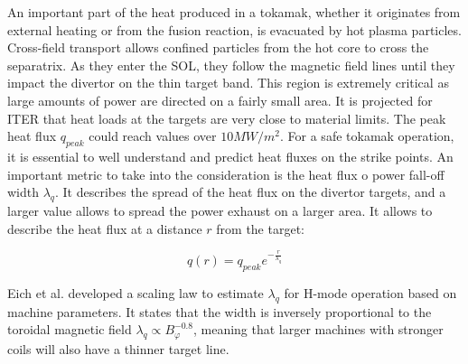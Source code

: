 An important part of the heat produced in a tokamak, whether it originates from external heating or from the fusion reaction, is evacuated by hot plasma particles. Cross-field transport allows confined particles from the hot core to cross the separatrix. As they enter the SOL, they follow the magnetic field lines until they impact the divertor on the thin target band. This region is extremely critical as large amounts of power are directed on a fairly small area. It is projected for ITER that heat loads at the targets are very close to material limits\cite{gunn2017surface}. The peak heat flux $q_{peak}$ could reach values over $10MW/m^2$. For a safe tokamak operation, it is essential to well understand and predict heat fluxes on the strike points. An important metric to take into the consideration is the heat flux o power fall-off width $\lambda_q$. It describes the spread of the heat flux on the divertor targets, and a larger value allows to spread the power exhaust on a larger area. It allows to describe the heat flux at a distance $r$ from the target:

\begin{equation}
	q(r) =  q_{peak}e^{-\frac{r}{\lambda_q}}
\end{equation}

Eich et al.\cite{eich2013scaling} developed a scaling law to estimate $\lambda_q$ for H-mode operation based on machine parameters. It states that the width is inversely proportional to the toroidal magnetic field $\lambda_q\propto B_\varphi^{-0.8}$, meaning that larger machines with stronger coils will also have a thinner target line. 






